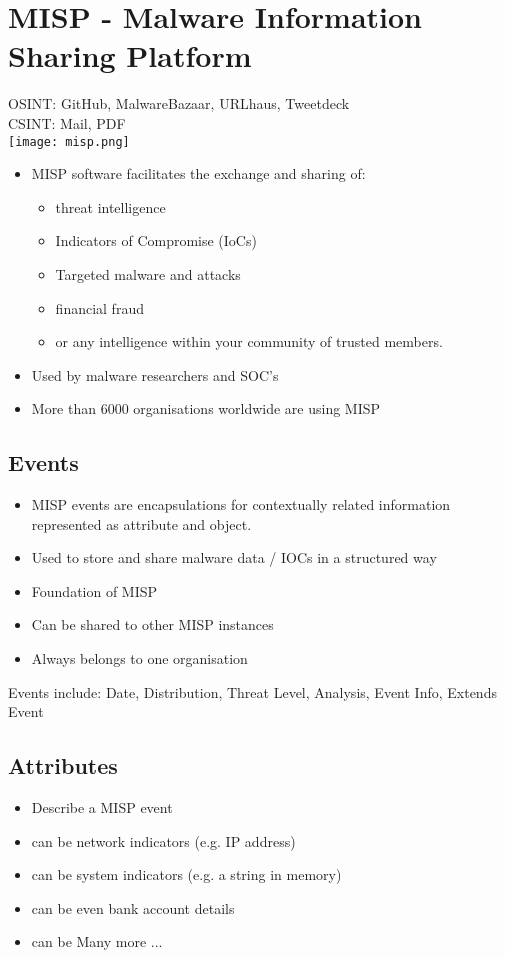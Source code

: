 \section{MISP - Malware Information Sharing Platform}
OSINT: GitHub, MalwareBazaar, URLhaus, Tweetdeck\\
CSINT: Mail, PDF\\
\texttt{[image: misp.png]}
\begin{itemize}
    \item MISP software facilitates the exchange and sharing of:
    \begin{itemize}
        \item threat intelligence
        \item Indicators of Compromise (IoCs)
        \item Targeted malware and attacks
        \item financial fraud
        \item or any intelligence within your community of trusted members.
    \end{itemize}
    \item Used by malware researchers and SOC’s
    \item More than 6000 organisations worldwide are using MISP
\end{itemize}
\subsection{Events}
\begin{itemize}
    \item MISP events are encapsulations for contextually related information represented as attribute and object.
    \item Used to store and share malware data / IOCs in a structured way
    \item Foundation of MISP
    \item Can be shared to other MISP instances
    \item Always belongs to one organisation
\end{itemize}
Events include: Date, Distribution, Threat Level, Analysis, Event Info, Extends Event
\subsection{Attributes}
\begin{itemize}
    \item Describe a MISP event
    \item can be network indicators (e.g. IP address)
    \item can be system indicators (e.g. a string in memory)
    \item can be even bank account details
    \item can be Many more ...
\end{itemize}

